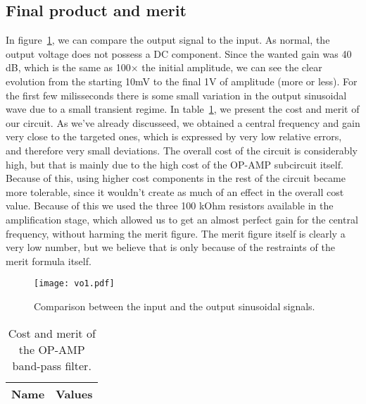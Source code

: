 \subsection{Final product and merit}
In figure~\ref{fig:comp}, we can compare the output signal to the input. As normal, the output voltage does not possess a DC component. Since the wanted gain was 40 dB, which is the same as 100$\times$ the initial amplitude, we can see the clear evolution from the starting 10mV to the final 1V of amplitude (more or less). For the first few milisseconds there is some small variation in the output sinusoidal wave due to a small transient regime.
In table~\ref{tab:merit}, we present the cost and merit of our circuit. As we've already discusseed, we obtained a central frequency and gain very close to the targeted ones, which is expressed by very low relative errors, and therefore very small deviations. The overall cost of the circuit is considerably high, but that is mainly due to the high cost of the OP-AMP subcircuit itself. Because of this, using higher cost components in the rest of the circuit became more tolerable, since it wouldn't create as much of an effect in the overall cost value. Because of this we used the three 100 kOhm resistors available in the amplification stage, which allowed us to get an almost perfect gain for the central frequency, without harming the merit figure. The merit figure itself is clearly a very low number, but we believe that is only because of the restraints of the merit formula itself.
\pagebreak
\begin{figure}[h!] \centering
\texttt{[image: vo1.pdf]}
\caption{Comparison between the input and the output sinusoidal signals.}
\label{fig:comp}
\end{figure}
\par
\begin{table}[h!]
  \centering
  \begin{tabular}{|l|r|}
    \hline    
    {\bf Name} & {\bf Values} \\ \hline
     
  \end{tabular}
  \caption{Cost and merit of the OP-AMP band-pass filter.}
  \label{tab:merit}
\end{table}

\pagebreak
